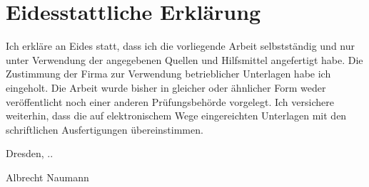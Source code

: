 \chapter*{Eidesstattliche Erklärung}

Ich erkläre an Eides statt, dass ich die vorliegende Arbeit selbstständig und nur unter Verwendung der angegebenen Quellen und Hilfsmittel angefertigt habe.
Die Zustimmung der Firma zur Verwendung betrieblicher Unterlagen habe ich eingeholt. Die Arbeit wurde bisher in gleicher oder ähnlicher Form weder veröffentlicht noch einer anderen Prüfungsbehörde vorgelegt.
Ich versichere weiterhin, dass die auf elektronischem Wege eingereichten Unterlagen mit den schriftlichen Ausfertigungen übereinstimmen.

\vspace{15mm} 
\noindent
Dresden, \the\day.\the\month.\the\year

\vspace{15mm}
\noindent
Albrecht Naumann